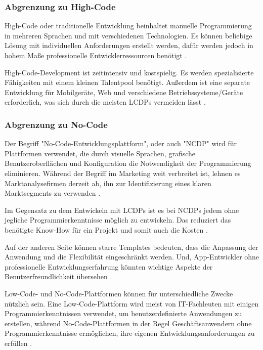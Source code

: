 \documentclass[12pt]{article} %
\begin{document}
	\subsubsection{Abgrenzung zu High-Code}
	High-Code oder traditionelle Entwicklung beinhaltet manuelle Programmierung in mehreren Sprachen und mit verschiedenen Technologien. Es können beliebige Lösung mit individuellen Anforderungen erstellt werden, dafür werden jedoch in hohem Maße professionelle Entwicklerressourcen benötigt \autocite{Mendix.2023}. \newline
	
	High-Code-Development ist zeitintensiv und kostspielig. Es werden spezialisierte Fähigkeiten mit einem kleinen Talentpool benötigt. Außerdem ist eine separate Entwicklung für Mobilgeräte, Web und verschiedene Betriebssysteme/Geräte erforderlich, was sich durch die meisten LCDPs vermeiden lässt \autocite{Mendix.2023}. 
	
	\subsubsection{Abgrenzung zu No-Code}
	Der Begriff "No-Code-Entwicklungsplattform", oder auch "NCDP" wird für Plattformen verwendet, die durch visuelle Sprachen, grafische Benutzeroberflächen und Konfiguration die Notwendigkeit der Programmierung eliminieren. Während der Begriff im Marketing weit verbreitet ist, lehnen es Marktanalysefirmen derzeit ab, ihn zur Identifizierung eines klaren Marktsegments zu verwenden \autocite{DiRuscio.2022}.
	
	Im Gegensatz zu dem Entwickeln mit LCDPs ist es bei NCDPs jedem ohne jegliche Programmierkenntnisse möglich zu entwickeln. Das reduziert das benötigte Know-How für ein Projekt und somit auch die Kosten \autocite{Microsoft.2023}. \newline
	
	Auf der anderen Seite können starre Templates bedeuten, dass die Anpassung der Anwendung und die Flexibilität eingeschränkt werden.
	Und, App-Entwickler ohne professionelle Entwicklungserfahrung könnten wichtige Aspekte der Benutzerfreundlichkeit übersehen \autocite{Microsoft.2023}. \newline	
	
	Low-Code- und No-Code-Plattformen können für unterschiedliche Zwecke nützlich sein. Eine Low-Code-Plattform wird meist von IT-Fachleuten mit einigen Programmierkenntnissen verwendet, um benutzerdefinierte Anwendungen zu erstellen, während No-Code-Plattformen in der Regel Geschäftsanwendern ohne Programmierkenntnisse ermöglichen, ihre eigenen Entwicklungsanforderungen zu erfüllen \autocite{Microsoft.2023}. 
\end{document}
